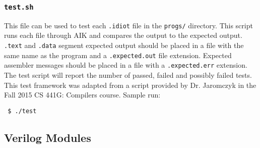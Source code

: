 \documentclass[conference]{IEEEtran}
\begin{document}
\subsubsection{\texttt{test.sh}}
This file can be used to test each \texttt{.idiot} file in the \texttt{progs/}
directory. This script runs each file through AIK and compares the output to
the expected output. \texttt{.text} and \texttt{.data} segment expected
output should be placed in a file with the same name as the program and a 
\texttt{.expected.out} file extension. Expected assembler messages should
be placed in a file with a \texttt{.expected.err} extension. The test script
will report the number of passed, failed and possibly failed tests. This test
framework was adapted from a script provided by Dr. Jaromczyk in the Fall
2015 CS 441G: Compilers course. Sample run:
\begin{verbatim}
 $ ./test
\end{verbatim}
\subsection{Verilog Modules}
\end{document}
